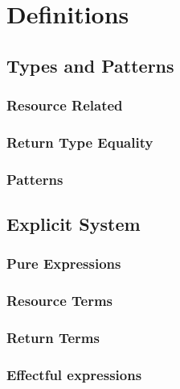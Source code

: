 \chapter{Definitions}\label{chap:defns}

\begingroup%
\raggedright%
\section{Types and Patterns}

\subsection{Resource Related}
\cndefnsresXXjudge%

\subsection{Return Type Equality}
\cndefnsretXXjudge%

\subsection{Patterns}
\cndefnspatXXjudge%

\section{Explicit System}

\subsection{Pure Expressions}
\cndefnsexplXXpure%

\subsection{Resource Terms}
\cndefnsexplXXres%

\subsection{Return Terms}
\cndefnsexplXXspine%

\subsection{Effectful expressions}
\cndefnsexplXXaction%
\cndefnsexplXXmemop%
\cndefnsexplXXstmt%

